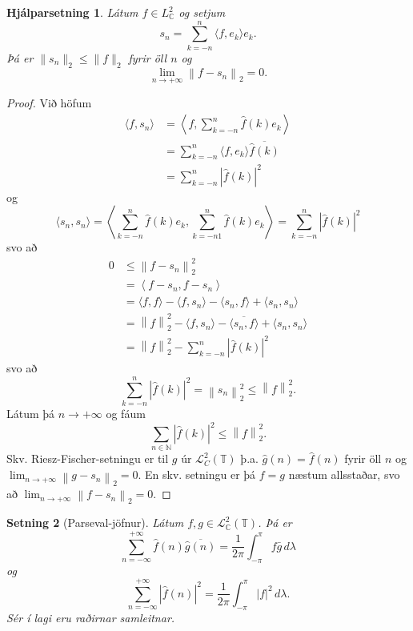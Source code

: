 \documentclass[a4paper,icelandic,11pt]{book}
\theoremstyle{plain}      \newtheorem{setn}{Setning}[chapter]
\newtheorem{lemma}[setn]{Hjálparsetning}
\theoremstyle{definition} \newtheorem{skilgr}[setn]{Skilgreining}
\theoremstyle{remark}     \newtheorem*{ath}{Athugasemd}
\newcommand{\C}{\mathbb C}
\newcommand{\N}{\mathbb N}
\begin{document}
\begin{lemma}
  Látum $f\in L_{\C}^{2}$ og setjum 
  \[
  s_{n} = \sum_{k=-n}^{n}\langle f,e_{k}\rangle e_{k}.
  \]
  Þá er $\|s_{n}\|_{2}\le\|f\|_{2}$ fyrir öll $n$ og 
  \[
  \lim_{n\to +\infty}\left\|
    f - s_{n}
  \right\|_{2}
  = 0.
  \]
\end{lemma}
\begin{proof}
  Við höfum 
  \begin{align*}
    \langle f,s_{n}\rangle
    &=
    \left\langle
      f, \sum_{k=-n}^{n}\hat f(k)e_{k}
    \right\rangle
    \\
    &= \sum_{k=-n}^{n}\langle f,e_{k}\rangle
    \overline{\hat f(k)}
    \\
    &= \sum_{k=-n}^{n}\left|
      \hat f(k)
    \right|^{2}
  \end{align*}
  og 
  \[
  \langle s_{n},s_{n}\rangle
  =
  \left\langle
    \sum_{k=-n}^{n}\hat f(k)e_{k},
    \sum_{k=-n1}^{n}\hat f(k)e_{k}
  \right\rangle
  = \sum_{k=-n}^{n}\left|
    \hat f(k)
  \right|^{2}
  \]
  svo að 
  \begin{align*}
    0
    &\le
    \left\|
      f - s_{n}
    \right\|_{2}^{2}
    \\
    &=
    \left\langle
      f - s_{n},f - s_{n}
    \right\rangle
    \\
    &= \langle f,f\rangle
    - \langle f,s_{n}\rangle
    - \langle s_{n},f\rangle
    + \langle s_{n},s_{n}\rangle
    \\
    &= \left\|
      f
    \right\|_{2}^{2}
    - \langle f,s_{n}\rangle
    - \overline{\langle s_{n}, f\rangle}
    + \langle s_{n},s_{n}\rangle
    \\
    &= \left\|
      f
    \right\|_{2}^{2} - \sum_{k=-n}^{n} \left|\hat f(k)\right|^{2}
  \end{align*}
  svo að 
  \[
  \sum_{k=-n}^{n}\left|
    \hat f(k)
  \right|^{2}
  = \left\|
    s_{n}
  \right\|_{2}^{2}
  \le \left\|
    f
  \right\|_{2}^{2}.
  \]
  Látum þá $n\longrightarrow +\infty$ og fáum 
  \[
  \sum_{n\in\N}\left|
    \hat f(k)
  \right|^{2}
  \le \left\|
    f
  \right\|_{2}^{2}.
  \]
  Skv. Riesz-Fischer-setningu er til $g$ úr $\mathcal
  L_{C}^{2}(\mathbb T)$ þ.a. $\hat g(n)=\hat f(n)$ fyrir öll $n$ og
  $\lim_{n\to+\infty}\left\| g - s_{n} \right\|_{2} = 0$. En
  skv. setningu er þá $f = g$ næstum allsstaðar, svo að
  $\lim_{n\to+\infty}\left\| f - s_{n} \right\|_{2} = 0$.
\end{proof}
\begin{setn}
  [Parseval-jöfnur]
  Látum $f,g\in\mathcal L_{\C}^{2}(\mathbb T)$. Þá er  
  \[
  \sum_{n=-\infty}^{+\infty}\hat f(n)\overline{\hat g(n)}
  = \frac{1}{2\pi}\int_{-\pi}^{\pi}f\bar g\,d\lambda
  \]
  og 
  \[
  \sum_{n=-\infty}^{+\infty}\left|
    \hat f(n)
  \right|^{2}
  = \frac{1}{2\pi}\int_{-\pi}^{\pi} \left|
    f
  \right|^{2}\,d\lambda.
  \]
  Sér í lagi eru raðirnar samleitnar.
\end{setn}
\end{document}
